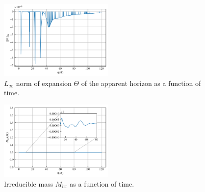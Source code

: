\documentclass[%
 reprint,
 amsmath,amssymb,
 aps,
 prd,
]{revtex4-2}
\begin{document}
\begin{figure}[h!]
	\includegraphics[width=0.5\textwidth]{data/expansion.png}%
	\caption{\label{fig:expansion} $L_\infty$ norm of expansion $\Theta$ of the apparent horizon as a function of time.}
\end{figure}


\begin{figure}[h!]
	\includegraphics[width=0.5\textwidth]{data/m_irr.png}%
	\caption{\label{fig:m_irr} Irreducible mass $M_\mathrm{irr}$ as a function of time.}
\end{figure}



\end{document}
